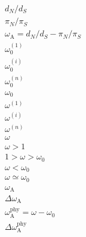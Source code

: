 \documentclass{article}
\newcommand{\dn}{d_N}
\newcommand{\ds}{d_S}
\newcommand{\dnds}{\dn / \ds}
\newcommand{\pn}{\pi_N}
\newcommand{\ps}{\pi_S}
\newcommand{\pnps}{\pn / \ps}
\begin{document}
\begin{gather*}
	\dnds \\
	\pnps \\
	\omega_{\mathrm{A}} = \dnds-\pnps \\
	\omega_{0}^{(1)} \\
	\omega_{0}^{(i)} \\
	\omega_{0}^{(n)} \\
	\omega_{0} \\
	\omega^{(1)}  \\
	\omega^{(i)} \\
	\omega^{(n)} \\
	\omega \\
	\omega > 1 \\
	1 > \omega > \omega_0 \\
	\omega < \omega_0 \\
	\omega \simeq \omega_0 \\
	\omega_{\mathrm{A}}\\
	\Delta \omega_{\mathrm{A}} \\
	\omega_{\mathrm{A}}^{\mathrm{phy}} = \omega - \omega_{0} \\
	\Delta \omega_{\mathrm{A}}^{\mathrm{phy}} \\
\end{gather*}
\end{document}

